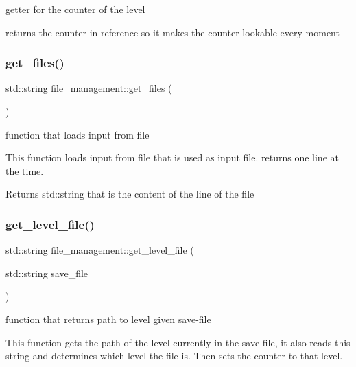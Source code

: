 getter for the counter of the level 

returns the counter in reference so it makes the counter lookable every moment \mbox{\label{classfile__management_a6c3f90ce958156adea878510097d64ef}} 
\subsubsection{\texorpdfstring{get\+\_\+files()}{get\_files()}}
{\footnotesize\ttfamily std\+::string file\+\_\+management\+::get\+\_\+files (\begin{DoxyParamCaption}{ }\end{DoxyParamCaption})}



function that loads input from file 

This function loads input from file that is used as input file. returns one line at the time.

\begin{DoxyReturn}{Returns}
std\+::string that is the content of the line of the file 
\end{DoxyReturn}
\mbox{\label{classfile__management_a58233800263bf74ae074a9a46f4a7bd0}} 
\subsubsection{\texorpdfstring{get\+\_\+level\+\_\+file()}{get\_level\_file()}}
{\footnotesize\ttfamily std\+::string file\+\_\+management\+::get\+\_\+level\+\_\+file (\begin{DoxyParamCaption}\item[{std\+::string}]{save\+\_\+file }\end{DoxyParamCaption})}



function that returns path to level given save-\/file 

This function gets the path of the level currently in the save-\/file, it also reads this string and determines which level the file is. Then sets the counter to that level.


